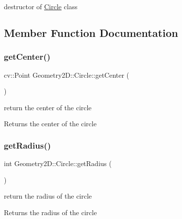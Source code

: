 destructor of \mbox{\hyperlink{class_geometry2_d_1_1_circle}{Circle}} class 

\subsection{Member Function Documentation}
\mbox{\label{class_geometry2_d_1_1_circle_ad6605cfef3530b9185213f694c9fca6a}} 
\subsubsection{\texorpdfstring{get\+Center()}{getCenter()}}
{\footnotesize\ttfamily cv\+::\+Point Geometry2\+D\+::\+Circle\+::get\+Center (\begin{DoxyParamCaption}{ }\end{DoxyParamCaption})}

return the center of the circle \begin{DoxyReturn}{Returns}
the center of the circle 
\end{DoxyReturn}
\mbox{\label{class_geometry2_d_1_1_circle_a93adf6a4690d211a16800d0ddbeb9949}} 
\subsubsection{\texorpdfstring{get\+Radius()}{getRadius()}}
{\footnotesize\ttfamily int Geometry2\+D\+::\+Circle\+::get\+Radius (\begin{DoxyParamCaption}{ }\end{DoxyParamCaption})}

return the radius of the circle \begin{DoxyReturn}{Returns}
the radius of the circle 
\end{DoxyReturn}
\mbox{\label{class_geometry2_d_1_1_circle_a1d73cfc9f0e4fe3eb8a93e2a5a4f0ffd}} 
